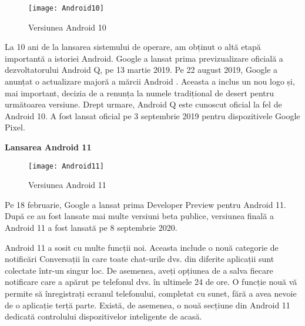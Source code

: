 \documentclass[a4paper]{article}
\begin{document}
\begin{figure}[h]
	\centering
	\texttt{[image: Android10]} \\
	\caption{Versiunea Android 10}
	\label{fig:Android10}
\end{figure}
\par
La 10 ani de la lansarea sistemului de operare, am obținut o altă etapă importantă a istoriei Android. Google a lansat prima previzualizare oficială a dezvoltatorului Android Q, pe 13 martie 2019. Pe 22 august 2019, Google a anunțat o actualizare majoră a mărcii Android . Aceasta a inclus un nou logo și, mai important, decizia de a renunța la numele tradițional de desert pentru următoarea versiune. Drept urmare, Android Q este cunoscut oficial la fel de Android 10. A fost lansat oficial pe 3 septembrie 2019 pentru dispozitivele Google Pixel.
\clearpage
\begin{center}
	\large\textbf{Lansarea Android 11}
\end{center}

\begin{figure}[h]
	\centering
	\texttt{[image: Android11]} \\
	\caption{Versiunea Android 11}
	\label{fig:Android11}
\end{figure}
\par
Pe 18 februarie, Google a lansat prima Developer Preview pentru Android 11. După ce au fost lansate mai multe versiuni beta publice, versiunea finală a Android 11 a fost lansată pe 8 septembrie 2020.
\par
Android 11 a sosit cu multe funcții noi. Aceasta include o nouă categorie de notificări Conversații în care toate chat-urile dvs. din diferite aplicații sunt colectate într-un singur loc. De asemenea, aveți opțiunea de a salva fiecare notificare care a apărut pe telefonul dvs. în ultimele 24 de ore. O funcție nouă vă permite să înregistrați ecranul telefonului, completat cu sunet, fără a avea nevoie de o aplicație terță parte. Există, de asemenea, o nouă secțiune din Android 11 dedicată controlului dispozitivelor inteligente de acasă.
\end{document}

